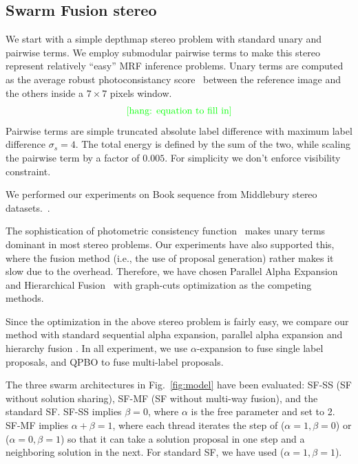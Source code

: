 \subsection{Swarm Fusion stereo}
We start with a simple depthmap stereo problem with standard unary and
pairwise terms. We employ submodular pairwise terms to make this stereo
represent relatively ``easy'' MRF inference problems.
%
Unary terms are computed as the average robust photoconsistancy
score~\cite{woodford} between the reference image and the others inside a $7\times 7$
pixels window.
\begin{equation}
  \text{\textcolor{green}{[hang: {equation to fill in}]}}
\end{equation}
Pairwise terms are simple truncated absolute label
difference with maximum label difference $\sigma_s=4$. The total energy is
defined by the sum of the two, while scaling the pairwise term by a
factor of $0.005$. For simplicity we don't enforce visibility constraint.

%
We performed our experiments on Book sequence from Middlebury stereo datasets.~\cite{middlebury_stereo}.


\noindent The sophistication of photometric consistency
function~\cite{mvs_furukawa_survey} makes unary terms dominant in most
stereo problems.  Our experiments have also supported this, where the
fusion method (i.e., the use of proposal generation) rather makes it
slow due to the overhead. Therefore, we have chosen Parallel Alpha
Expansion~\cite{delong} and Hierarchical Fusion~\cite{delong,olga}
with graph-cuts optimization as the competing methods.

Since the optimization in the above stereo problem is fairly easy, we
compare our method with standard sequential alpha expansion, parallel
alpha expansion \cite{first_fusion_viktor} and hierarchy fusion
\cite{olga}. In all experiment, we use $\alpha$-expansion to fuse
single label proposals, and QPBO to fuse multi-label proposals. 



\noindent The three swarm architectures in Fig.~\ref{fig:model} have
been evaluated: SF-SS (SF without solution sharing), SF-MF (SF without
multi-way fusion), and the standard SF.
%
SF-SS implies $\beta=0$, where $\alpha$ is the free parameter and set to
2. SF-MF implies $\alpha+\beta=1$, where each thread iterates the step
of ($\alpha=1, \beta=0$) or ($\alpha=0, \beta=1$) so that it can take a
solution proposal in one step and a neighboring solution in the
next. For standard SF, we have used ($\alpha=1, \beta=1$).


